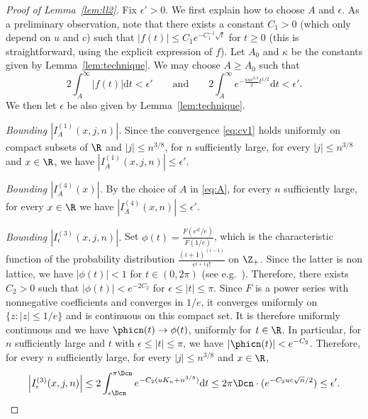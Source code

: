 \begin{proof}[Proof of Lemma~\ref{lem:ll2}]
Fix $\epsilon'>0$. We first explain how to choose $A$ and $\epsilon$.
As a preliminary observation, note that there exists a constant $C_{1}>0$
(which only depend on $u$ and $c$) such that $|f(t)| \leq C_{1} e^{-C_{1}^{-1} \sqrt{t}}$ for $t \geq 0$
(this is straightforward, using the explicit expression of $f$).
Let $A_{0}$ and $\kappa$ be the constants given by Lemma~\ref{lem:technique}.
We may choose $A \geq A_{0}$ such that
\begin{equation}
\label{eq:A}2\int_{A}^{\infty} |f(t)|  \mathrm{d}t <\epsilon' \qquad \textrm{and} \qquad  2 \int_{A}^{\infty} e^{- \frac{\kappa u c^{3/2}}{2} t^{1/2}} \mathrm{d}t < \epsilon'.
\end{equation}
We then let $\epsilon$ be also given by Lemma~\ref{lem:technique}.






\emph{Bounding $|I^{(1)}_{A}(x,j,n)|$.} Since the convergence \eqref{eq:cv1} holds  uniformly on compact subsets of $\R$ and $|j| \leq n^{3/8}$, for   $n$ sufficiently large, for every $|j| \leq n^{3/8}$ and $x \in \R$, we have $|I^{(1)}_{A}(x,j,n)| \leq \epsilon'$.

\emph{Bounding $|I^{(4)}_{A}(x)|$.} By the choice of $A$ in \eqref{eq:A}, for every $n$ sufficiently large, for every $x \in \R$ we have $|I^{(4)}_{A}(x,n)| \leq \epsilon'$.

\emph{Bounding $|I^{(3)}_{\epsilon}(x,j,n)|$.}  Set $\phi(t)=\frac{F(e^{it}/e)}{F(1/e)}$, which is the characteristic function of  the probability distribution $ \frac{(i+1)^{(i-1)}}{e^{i+1} i!}$ on $\Z_{+}$. Since the latter is non lattice, we have $|\phi(t)|<1$ for $t \in (0,2\pi)$ (see e.g.~\cite[Theorem 3.5.1]{Dur10}).
Therefore, there exists $C_2>0$ such that $|\phi(t)|<e^{-2C_2}$ for $ \epsilon \leq |t| \leq \pi$.
Since $F$ is a power series with nonnegative coefficients and converges in $1/e$,
it converges uniformly on $\{z: |z| \le 1/e\}$ and is continuous on this compact set.
It is therefore uniformly continuous and
we have $\phicn(t) \rightarrow \phi(t)$, uniformly for $t \in \R$.
In particular, for $n$ sufficiently large and $t$ with $ \epsilon \leq |t| \leq \pi$,
we have $|\phicn(t)|<e^{-C_2}$.
 Therefore, for every $n$ sufficiently large, for every $|j| \leq n^{3/8}$ and  $x \in \R$,
 \[ \left|I^{(3)}_{\epsilon}(x,j,n) \right|  \leq 2 \int_{\epsilon \Dcn}^{\pi \Dcn} e^{-C_2 (uK_{n}  +n^{3/8})} \mathrm{d}t
 \leq 2 \pi \Dcn \cdot (e^{- C_2 u c \sqrt{n}/2} ) \le \epsilon'.\]


\end{proof}
